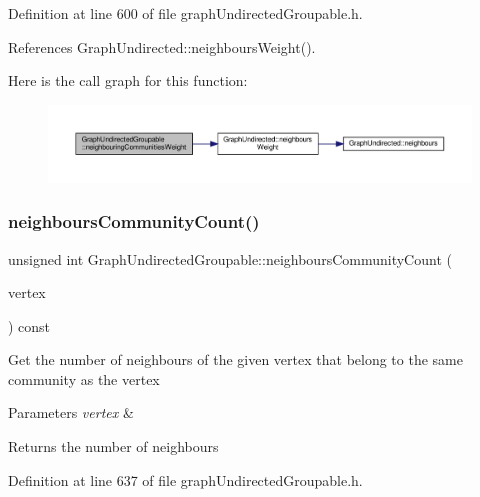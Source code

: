 Definition at line 600 of file graph\+Undirected\+Groupable.\+h.



References Graph\+Undirected\+::neighbours\+Weight().

Here is the call graph for this function\+:
\nopagebreak
\begin{figure}[H]
\begin{center}
\leavevmode
\includegraphics[width=350pt]{classGraphUndirectedGroupable_ae8d5d8cea2c1dfba0b4e7110100f2973_cgraph}
\end{center}
\end{figure}
\mbox{\label{classGraphUndirectedGroupable_ae70ef901c94e0d117abbaa5cd64a63e6}} 
\subsubsection{\texorpdfstring{neighbours\+Community\+Count()}{neighboursCommunityCount()}}
{\footnotesize\ttfamily unsigned int Graph\+Undirected\+Groupable\+::neighbours\+Community\+Count (\begin{DoxyParamCaption}\item[{const \hyperlink{edge_8h_a5fbd20c46956d479cb10afc9855223f6}{type\+Vertex} \&}]{vertex }\end{DoxyParamCaption}) const\hspace{0.3cm}{\ttfamily [inline]}}

Get the number of neighbours of the given vertex that belong to the same community as the vertex


\begin{DoxyParams}{Parameters}
{\em vertex} & \\
\hline
\end{DoxyParams}
\begin{DoxyReturn}{Returns}
the number of neighbours 
\end{DoxyReturn}


Definition at line 637 of file graph\+Undirected\+Groupable.\+h.




